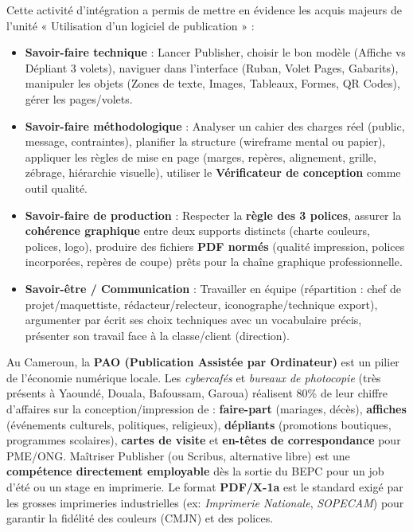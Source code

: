 \documentclass[11pt]{article}
\newcounter{popsec}
\newcounter{popsub}
\newcommand{\courssub}[1]{%
  \stepcounter{popsub}%
  \par\vspace{9pt}\noindent{\popxbold\fontsize{11.5}{13}\selectfont\color{popink}{\color{poporange}\thepopsec.\thepopsub}\hspace{6pt}#1}\par\nopagebreak\vspace{4pt}
}
\begin{document}
\courssub{Bilan de l'activité}
Cette activité d'intégration a permis de mettre en évidence les acquis majeurs de l'unité « Utilisation d'un logiciel de publication » :

\begin{aretenir}
\begin{itemize}
    \item \textbf{Savoir-faire technique} : Lancer Publisher, choisir le bon modèle (Affiche vs Dépliant 3 volets), naviguer dans l'interface (Ruban, Volet Pages, Gabarits), manipuler les objets (Zones de texte, Images, Tableaux, Formes, QR Codes), gérer les pages/volets.
    \item \textbf{Savoir-faire méthodologique} : Analyser un cahier des charges réel (public, message, contraintes), planifier la structure (wireframe mental ou papier), appliquer les règles de mise en page (marges, repères, alignement, grille, zébrage, hiérarchie visuelle), utiliser le \textbf{Vérificateur de conception} comme outil qualité.
    \item \textbf{Savoir-faire de production} : Respecter la \textbf{règle des 3 polices}, assurer la \textbf{cohérence graphique} entre deux supports distincts (charte couleurs, polices, logo), produire des fichiers \textbf{PDF normés} (qualité impression, polices incorporées, repères de coupe) prêts pour la chaîne graphique professionnelle.
    \item \textbf{Savoir-être / Communication} : Travailler en équipe (répartition : chef de projet/maquettiste, rédacteur/relecteur, iconographe/technique export), argumenter par écrit ses choix techniques avec un vocabulaire précis, présenter son travail face à la classe/client (direction).
\end{itemize}
\end{aretenir}

\begin{savaistu}
Au Cameroun, la \textbf{PAO (Publication Assistée par Ordinateur)} est un pilier de l'économie numérique locale. Les \emph{cybercafés} et \emph{bureaux de photocopie} (très présents à Yaoundé, Douala, Bafoussam, Garoua) réalisent 80\% de leur chiffre d'affaires sur la conception/impression de : \textbf{faire-part} (mariages, décès), \textbf{affiches} (événements culturels, politiques, religieux), \textbf{dépliants} (promotions boutiques, programmes scolaires), \textbf{cartes de visite} et \textbf{en-têtes de correspondance} pour PME/ONG. Maîtriser Publisher (ou Scribus, alternative libre) est une \textbf{compétence directement employable} dès la sortie du BEPC pour un job d'été ou un stage en imprimerie. Le format \textbf{PDF/X-1a} est le standard exigé par les grosses imprimeries industrielles (ex: \emph{Imprimerie Nationale}, \emph{SOPECAM}) pour garantir la fidélité des couleurs (CMJN) et des polices.
\end{savaistu}
\end{document}
